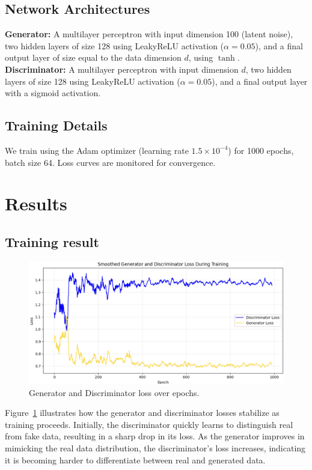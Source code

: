 \documentclass[12pt, a4paper, twocolumn]{article}
\begin{document}
\subsection{Network Architectures}
\textbf{Generator:} A multilayer perceptron with input dimension 100 (latent noise), two hidden layers of size 128 using LeakyReLU activation ($\alpha=0.05$), and a final output layer of size equal to the data dimension $d$, using $\tanh$.\\
\textbf{Discriminator:} A multilayer perceptron with input dimension $d$, two hidden layers of size 128 using LeakyReLU activation ($\alpha=0.05$), and a final output layer with a sigmoid activation.

\subsection{Training Details}
We train using the Adam optimizer (learning rate $1.5\times10^{-4}$) for 1000 epochs, batch size 64. Loss curves are monitored for convergence.

\section{Results}
\subsection{Training result}

\begin{figure}[!ht]
\centering
\includegraphics[width=6in]{loss_curve.png}
\caption{Generator and Discriminator loss over epochs.}
\label{fig:loss_curve}
\end{figure}

Figure~\ref{fig:loss_curve} illustrates how the generator and discriminator losses stabilize as training proceeds. Initially, the discriminator quickly learns to distinguish real from fake data, resulting in a sharp drop in its loss. As the generator improves in mimicking the real data distribution, the discriminator's loss increases, indicating it is becoming harder to differentiate between real and generated data.
\end{document}
